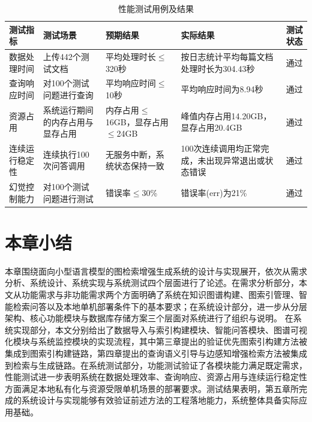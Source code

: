 \documentclass[promaster, vlined]{DissertUESTC}
\begin{document}
\begin{table}[!ht]
\caption{性能测试用例及结果}
\centering
\setlength{\tabcolsep}{3pt}
\begin{tabular}{@{}>{\raggedright\arraybackslash}p{1.6cm}>{\raggedright\arraybackslash}p{2.8cm}>{\raggedright\arraybackslash}p{2.8cm}>{\raggedright\arraybackslash}p{3.2cm}>{\centering\arraybackslash}p{1.2cm}@{}}
\toprule
测试指标 & 测试场景 & 预期结果 & 实际结果 & 测试状态 \\
\midrule
数据处理时间 & 上传442个测试文档 & 平均处理时长$\leq$320秒 & 按日志统计平均每篇文档处理时长为304.43秒 & 通过 \\
查询响应时间 & 对100个测试问题进行查询 & 平均响应时间$\leq$10秒 & 平均响应时间为8.94秒 & 通过 \\
资源占用 & 系统运行期间的内存占用与显存占用 & 内存占用$\leq$16GB，显存占用$\leq$24GB & 峰值内存占用14.20GB，显存占用20.4GB & 通过 \\
连续运行稳定性 & 连续执行100次问答调用 & 无服务中断，系统状态保持一致 & 100次连续调用均正常完成，未出现异常退出或状态错误 & 通过 \\
幻觉控制能力 & 对100个测试问题进行测试 & 错误率$\leq$30\% & 错误率(err)为21\% & 通过 \\
\bottomrule
\end{tabular}
\label{tab:performance_test}
\end{table}


\section{本章小结}

本章围绕面向小型语言模型的图检索增强生成系统的设计与实现展开，依次从需求分析、系统设计、系统实现与系统测试四个层面进行了论述。在需求分析部分，本文从功能需求与非功能需求两个方面明确了系统在知识图谱构建、图索引管理、智能检索问答以及本地单机部署条件下的基本要求；在系统设计部分，进一步从分层架构、核心功能模块与数据库存储方案三个层面对系统进行了组织与说明。
在系统实现部分，本文分别给出了数据导入与索引构建模块、智能问答模块、图谱可视化模块与系统监控模块的实现流程，其中第三章提出的验证优先图索引构建方法被集成到图索引构建链路，第四章提出的查询语义引导与边感知增强检索方法被集成到检索与生成链路。在系统测试部分，功能测试验证了各模块能力满足既定需求，性能测试进一步表明系统在数据处理效率、查询响应、资源占用与连续运行稳定性方面满足本地私有化与资源受限单机场景的部署要求。测试结果表明，第五章所完成的系统设计与实现能够有效验证前述方法的工程落地能力，系统整体具备实际应用基础。
\end{document}
